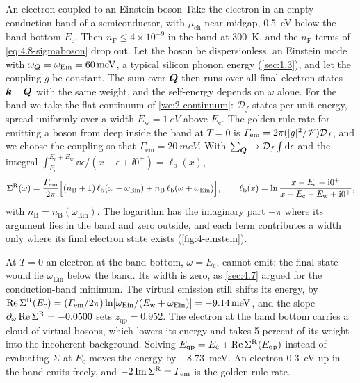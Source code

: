 \begin{workedexample}{An electron coupled to an Einstein boson}\label{we:4-einstein}
Take the electron in an empty conduction band of a semiconductor, with $\mu_{\mathrm{ch}}$ near midgap, \SI{0.5}{eV} below the band bottom $E_{\mathrm{c}}$. Then $n_{\mathrm{F}} \le 4\times10^{-9}$ in the band at \SI{300}{K}, and the $n_{\mathrm{F}}$ terms of \cref{eq:4.8-sigmaboson} drop out. Let the boson be dispersionless, an Einstein mode with $\omega_{\bm{Q}} = \omega_{\mathrm{Ein}} = \SI{60}{meV}$, a typical silicon phonon energy (\cref{sec:1.3}), and let the coupling $g$ be constant. The sum over $\bm{Q}$ then runs over all final electron states $\bm{k} - \bm{Q}$ with the same weight, and the self-energy depends on $\omega$ alone. For the band we take the flat continuum of \cref{we:2-continuum}: $\mathcal{D}_f$ states per unit energy, spread uniformly over a width $E_{\mathrm{w}} = \SI{1}{eV}$ above $E_{\mathrm{c}}$. The golden-rule rate for emitting a boson from deep inside the band at $T = 0$ is $\varGamma_{\mathrm{em}} = 2\pi(|g|^2/\mathscr{V})\mathcal{D}_f$, and we choose the coupling so that $\varGamma_{\mathrm{em}} = \SI{20}{meV}$. With $\sum_{\bm{Q}} \to \mathcal{D}_f\int\mathrm{d}\epsilon$ and the integral $\int_{E_{\mathrm{c}}}^{E_{\mathrm{c}}+E_{\mathrm{w}}}\dd\epsilon/(x - \epsilon + \ii0^+) = \ell_{\mathrm{b}}(x)$,
\begin{equation*}
  \Sigma^{\mathrm{R}}(\omega) = \frac{\varGamma_{\mathrm{em}}}{2\pi}\Bigl[(n_{\mathrm{B}} + 1)\,\ell_{\mathrm{b}}(\omega - \omega_{\mathrm{Ein}}) + n_{\mathrm{B}}\,\ell_{\mathrm{b}}(\omega + \omega_{\mathrm{Ein}})\Bigr], \qquad
  \ell_{\mathrm{b}}(x) = \ln\frac{x - E_{\mathrm{c}} + \mathrm{i}0^+}{x - E_{\mathrm{c}} - E_{\mathrm{w}} + \mathrm{i}0^+} ,
\end{equation*}
with $n_{\mathrm{B}} = n_{\mathrm{B}}(\omega_{\mathrm{Ein}})$. The logarithm has the imaginary part $-\pi$ where its argument lies in the band and zero outside, and each term contributes a width only where its final electron state exists (\cref{fig:4-einstein}).

At $T = 0$ an electron at the band bottom, $\omega = E_{\mathrm{c}}$, cannot emit: the final state would lie $\omega_{\mathrm{Ein}}$ below the band. Its width is zero, as \cref{sec:4.7} argued for the conduction-band minimum. The virtual emission still shifts its energy, by $\operatorname{Re}\Sigma^{\mathrm{R}}(E_{\mathrm{c}}) = (\varGamma_{\mathrm{em}}/2\pi)\ln[\omega_{\mathrm{Ein}}/(E_{\mathrm{w}} + \omega_{\mathrm{Ein}})] = \SI{-9.14}{meV}$, and the slope $\partial_\omega\operatorname{Re}\Sigma^{\mathrm{R}} = -0.0500$ sets $z_{\mathrm{qp}} = 0.952$. The electron at the band bottom carries a cloud of virtual bosons, which lowers its energy and takes 5 percent of its weight into the incoherent background. Solving $E_{\mathrm{qp}} = E_{\mathrm{c}} + \operatorname{Re}\Sigma^{\mathrm{R}}(E_{\mathrm{qp}})$ instead of evaluating $\Sigma$ at $E_{\mathrm{c}}$ moves the energy by \SI{-8.73}{meV}. An electron \SI{0.3}{eV} up in the band emits freely, and $-2\operatorname{Im}\Sigma^{\mathrm{R}} = \varGamma_{\mathrm{em}}$ is the golden-rule rate.


\end{workedexample}

